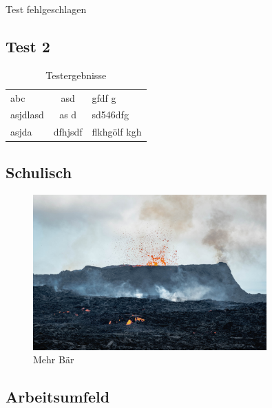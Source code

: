 Test fehlgeschlagen

\subsection{Test 2}

\begin{table}
\centering
\begin{tabularx}{0.9\textwidth}{l | c X}
abc & asd & gfdf g \\
asjdlasd & as  d & sd546dfg \\
asjda & dfhjsdf & flkhgölf kgh \\
\end{tabularx}
\caption{Testergebnisse}
\label{fig:tolle_tabelle}
\end{table}

\subsection{Schulisch}

\begin{figure}
  \centering
  \includegraphics[width=0.8\textwidth]{fotos/d}
  \caption{Mehr Bär}
\end{figure}

\lipsum[1-5]

\subsection{Arbeitsumfeld}

\lipsum[1-2]